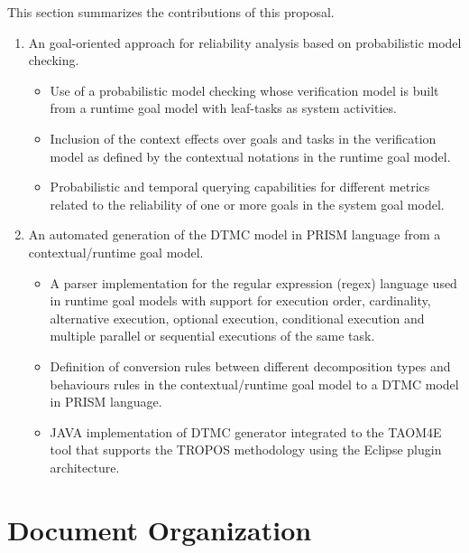 This section summarizes the contributions of this proposal.


\begin{enumerate}

\item An goal-oriented approach for reliability analysis based on probabilistic model checking.

\begin{itemize}

\item Use of a probabilistic model checking whose verification model is built from a runtime goal model with leaf-tasks as system activities.
\medskip

\item Inclusion of the context effects over goals and tasks in the verification model as defined by the contextual notations in the runtime goal model.
\medskip

\item Probabilistic and temporal querying capabilities for different metrics related to the reliability of one or more goals in the system goal model.
\end{itemize}
\bigskip

\item An automated generation of the DTMC model in PRISM language from a contextual/runtime goal model.
\begin{itemize}

\item A parser implementation for the regular expression (regex) language used in runtime goal models with support for execution order, cardinality, alternative execution, optional execution, conditional execution and multiple parallel or sequential executions of the same task. 
\medskip

\item Definition of conversion rules between different decomposition types and behaviours rules in the contextual/runtime goal model to a DTMC model in PRISM language.
\medskip

\item JAVA implementation of DTMC generator integrated to the TAOM4E tool that supports the TROPOS methodology using the Eclipse plugin architecture.
\end{itemize}

\end{enumerate}

\section{Document Organization}

